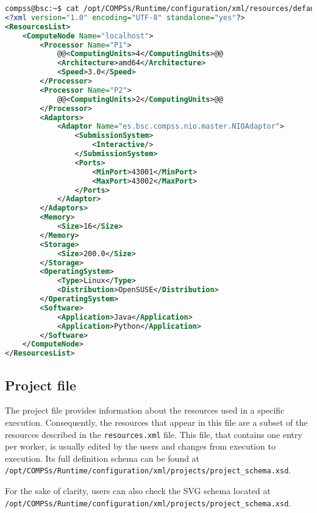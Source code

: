 \begin{lstlisting}[language=xml,moredelim={[is][\textcolor{red}]{@@}{@@}}]
compss@bsc:~$ cat /opt/COMPSs/Runtime/configuration/xml/resources/default_resources.xml
<?xml version="1.0" encoding="UTF-8" standalone="yes"?>
<ResourcesList>
    <ComputeNode Name="localhost">
        <Processor Name="P1">
            @@<ComputingUnits>4</ComputingUnits>@@
            <Architecture>amd64</Architecture>
            <Speed>3.0</Speed>
        </Processor>
        <Processor Name="P2">
            @@<ComputingUnits>2</ComputingUnits>@@
        </Processor>
        <Adaptors>
            <Adaptor Name="es.bsc.compss.nio.master.NIOAdaptor">
                <SubmissionSystem>
                    <Interactive/>
                </SubmissionSystem>
                <Ports>
                    <MinPort>43001</MinPort>
                    <MaxPort>43002</MaxPort>
                </Ports>
            </Adaptor>
        </Adaptors>
        <Memory>
            <Size>16</Size>
        </Memory>
        <Storage>
            <Size>200.0</Size>
        </Storage>
        <OperatingSystem>
            <Type>Linux</Type>
            <Distribution>OpenSUSE</Distribution>
        </OperatingSystem>
        <Software>
            <Application>Java</Application>
            <Application>Python</Application>
        </Software>
    </ComputeNode>
</ResourcesList>
\end{lstlisting}


\subsection{Project file}
The project file provides information about the resources used in a specific execution. Consequently, the resources that
appear in this file are a subset of the resources described in the \texttt{resources.xml} file. This file, that contains
one entry per worker, is usually edited by the users and changes from execution to execution. Its full definition
schema can be found at
\texttt{/opt/COMPSs/Runtime/configuration/xml/projects/project\_schema.xsd}.

For the sake of clarity, users can also check the SVG schema located at \\
\texttt{/opt/COMPSs/Runtime/configuration/xml/projects/project\_schema.xsd}.

